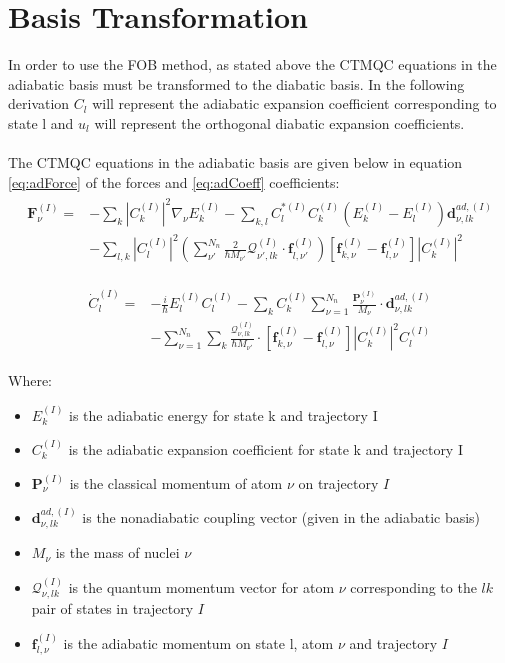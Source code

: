 \section{Basis Transformation}
In order to use the FOB method, as stated above the CTMQC equations in the adiabatic basis must be transformed to the diabatic basis. In the following derivation $C_{l}$ will represent the adiabatic expansion coefficient corresponding to state l and $u_{l}$ will represent the orthogonal diabatic expansion coefficients.
\\\\
The CTMQC equations in the adiabatic basis are given below in equation \eqref{eq:adForce} of the forces and \eqref{eq:adCoeff} coefficients:
\begin{align}
  \begin{split}
	  \mathbf{F}_{\nu}^{(I)} = &- \sum_{k} |C_{k}^{(I)}|^2 \nabla_{\nu}E_{k}^{(I)} - \sum_{k, l} C_{l}^{* (I)} C_{k}^{(I)} \left(E_{k}^{(I)} - E_{l}^{(I)} \right) \mathbf{d}_{\nu, lk}^{ad, (I)} \\
	  &- \sum_{l,k} |C_{l}^{(I)}|^2 \left( \sum_{\nu'}^{N_{n}} \frac{2}{\hbar M_{\nu'}} \mathcal{Q}_{\nu', lk}^{(I)} \cdot \mathbf{f}_{l, \nu'}^{(I)} \right)\left[ \mathbf{f}_{k, \nu}^{(I)} - \mathbf{f}_{l, \nu}^{(I)} \right] |C_{k}^{(I)}|^2 
  \end{split}
  \label{eq:adForce}
\end{align}

\begin{align}
  \begin{split}
	\dot{C}_{l}^{(I)} = &-\frac{i}{\hbar} E_{l}^{(I)} C_{l}^{(I)} - \sum_{k} C_{k}^{(I)} \sum_{\nu=1}^{N_{n}} \frac{\mathbf{P}_{\nu}^{(I)}}{M_{\nu}} \cdot \mathbf{d}_{\nu, lk}^{ad, (I)} \\
	&- \sum_{\nu=1}^{N_{n}} \sum_{k} \frac{\mathcal{Q}_{\nu, lk}^{(I)}}{\hbar M_{\nu'}} \cdot \left[\mathbf{f}_{k, \nu}^{(I)} - \mathbf{f}_{l, \nu}^{(I)} \right] |C_{k}^{(I)}|^2 C_{l}^{(I)}
  \end{split}
  \label{eq:adCoeff}
\end{align}

\noindent Where:
\begin{itemize}
  \item $E_{k}^{(I)}$ is the adiabatic energy for state k and trajectory I
  \item $C_{k}^{(I)}$ is the adiabatic expansion coefficient for state k and trajectory I
  \item $\mathbf{P}_{\nu}^{(I)}$ is the classical momentum of atom $\nu$ on trajectory $I$
  \item $\mathbf{d}_{\nu, lk}^{ad, (I)}$ is the nonadiabatic coupling vector (given in the adiabatic basis)
  \item $M_{\nu}$ is the mass of nuclei $\nu$
  \item $\mathcal{Q}_{\nu, lk}^{(I)}$ is the quantum momentum vector for atom $\nu$ corresponding to the $lk$ pair of states in trajectory $I$
  \item $\mathbf{f}_{l, \nu}^{(I)}$ is the adiabatic momentum on state l, atom $\nu$ and trajectory $I$
\end{itemize}

